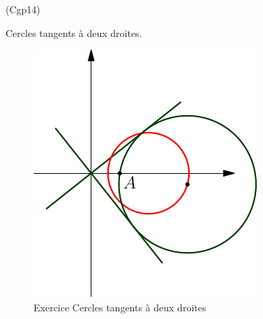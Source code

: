 \begin{tiny}(Cgp14)\end{tiny} Cercles tangents à deux droites.
\begin{figure}[h!t]
 \centering
 \includegraphics{./Cgp14_1.pdf}
 \caption{Exercice  Cercles tangents à deux droites}
 \label{fig:Cgp14_1}
\end{figure}

